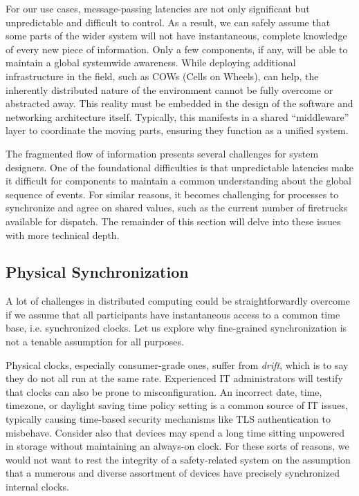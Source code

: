 \documentclass[]             %
{NASA}                       %
\theoremstyle{definition}
\begin{document}
For our use cases, message-passing latencies are not only significant
but unpredictable and difficult to control. As a result, we can safely
assume that some parts of the wider system will not have
instantaneous, complete knowledge of every new piece of
information. Only a few components, if any, will be able to maintain a
global systemwide awareness. While deploying additional infrastructure
in the field, such as COWs (Cells on Wheels), can help, the inherently
distributed nature of the environment cannot be fully overcome or
abstracted away. This reality must be embedded in the design of the
software and networking architecture itself. Typically, this manifests
in a shared ``middleware'' layer to coordinate the moving parts,
ensuring they function as a unified system.

The fragmented flow of information presents several challenges for
system designers. One of the foundational difficulties is that
unpredictable latencies make it difficult for components to maintain a
common understanding about the global sequence of events. For similar
reasons, it becomes challenging for processes to synchronize and agree
on shared values, such as the current number of firetrucks available
for dispatch. The remainder of this section will delve into these
issues with more technical depth.

\subsection{Physical Synchronization}
\label{ssec:physical-synchronization}
A lot of challenges in distributed computing could be
straightforwardly overcome if we assume that all participants have
instantaneous access to a common time base, i.e.  synchronized
clocks. Let us explore why fine-grained synchronization is not a
tenable assumption for all purposes.

Physical clocks, especially consumer-grade ones, suffer from
\emph{drift}, which is to say they do not all run at the same
rate. Experienced IT administrators will testify that clocks can also
be prone to misconfiguration. An incorrect date, time, timezone, or
daylight saving time policy setting is a common source of IT issues,
typically causing time-based security mechanisms like TLS
authentication to misbehave. Consider also that devices may spend a
long time sitting unpowered in storage without maintaining an
always-on clock. For these sorts of reasons, we would not want to rest
the integrity of a safety-related system on the assumption that a
numerous and diverse assortment of devices have precisely synchronized
internal clocks.
\end{document}
